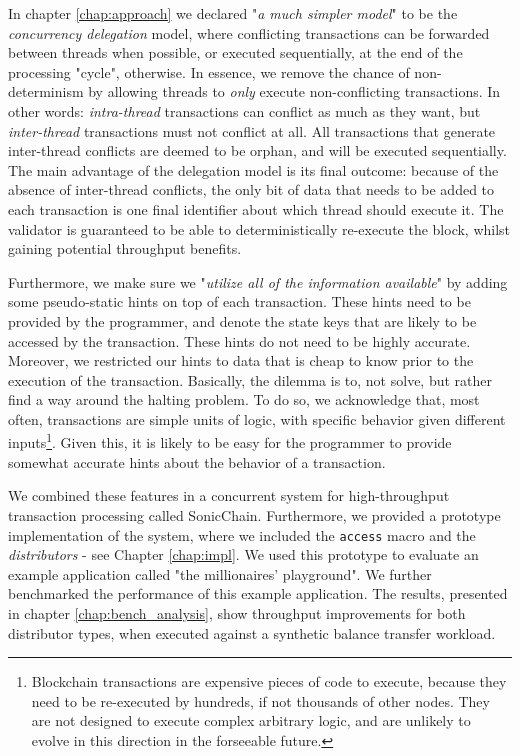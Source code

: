 In chapter \ref{chap:approach} we declared "\textit{a much simpler model}" to be the
\textit{concurrency delegation} model, where conflicting transactions can be forwarded between
threads when possible, or executed sequentially, at the end of the processing "cycle", otherwise. In
essence, we remove the chance of non-determinism by allowing threads to \textit{only} execute
non-conflicting transactions. In other words: \textit{intra-thread} transactions can conflict as
much as they want, but \textit{inter-thread} transactions must not conflict at all. All transactions
that generate inter-thread conflicts are deemed to be orphan, and will be executed sequentially. The
main advantage of the delegation model is its final outcome: because of the absence of inter-thread
conflicts, the only bit of data that needs to be added to each transaction is one final identifier
about which thread should execute it. The validator is guaranteed to be able to deterministically
re-execute the block, whilst gaining potential throughput benefits.

Furthermore, we make sure we "\textit{utilize all of the information available}" by adding some
pseudo-static hints on top of each transaction. These hints need to be provided by the programmer,
and denote the state keys that are likely to be accessed by the transaction. These hints do not need
to be highly accurate. Moreover, we restricted our hints to data that is cheap to know prior to the
execution of the transaction. Basically, the dilemma is to, not solve, but rather find a way around
the halting problem\cite{burkholderHaltingProblem1987}. To do so, we acknowledge that, most often,
transactions are simple units of logic, with specific behavior given different
inputs\footnote{Blockchain transactions are expensive pieces of code to execute, because they need
to be re-executed by hundreds, if not thousands of other nodes. They are not designed to execute
complex arbitrary logic, and are unlikely to evolve in this direction in the forseeable future.}.
Given this, it is likely to be easy for the programmer to provide somewhat accurate hints about the
behavior of a transaction.

We combined these features in a concurrent system for high-throughput transaction processing called
SonicChain. Furthermore, we provided a prototype implementation of the system, where we included the
\texttt{access} macro and the \textit{distributors} - see Chapter \ref{chap:impl}. We used this
prototype to evaluate an example application called "the millionaires' playground". We further
benchmarked the performance of this example application. The results, presented in chapter
\ref{chap:bench_analysis}, show throughput improvements for both distributor types, when executed
against a synthetic balance transfer workload.

